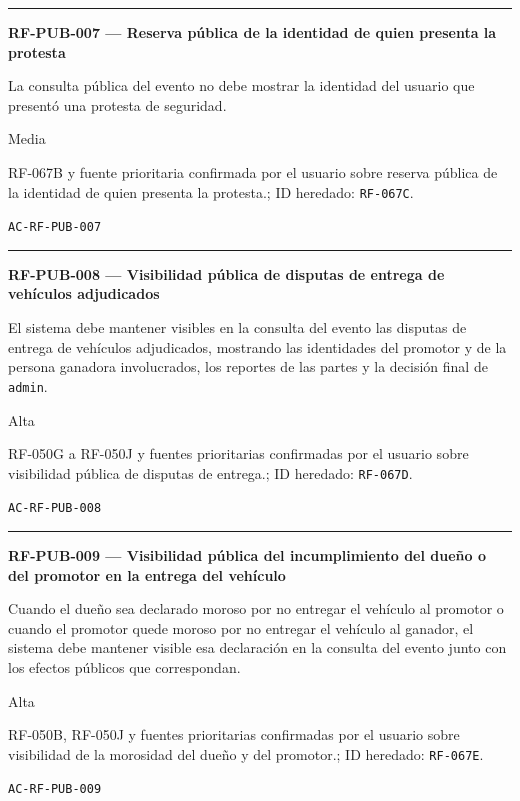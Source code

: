 \documentclass[10pt,letterpaper]{article}
\begin{document}
\vspace{0.25em}\hrule\vspace{0.65em}
\noindent\textbf{RF-PUB-007 --- Reserva pública de la identidad de quien presenta la protesta}\par
\begin{description}[style=nextline,leftmargin=3.15cm,labelwidth=2.8cm,font=\normalfont\bfseries]
\item[Obligación] La consulta pública del evento no debe mostrar la identidad del usuario que presentó una protesta de seguridad.
\item[Prioridad] Media
\item[Procedencia] RF-067B y fuente prioritaria confirmada por el usuario sobre reserva pública de la identidad de quien presenta la protesta.; ID heredado: \texttt{RF-067C}.
\item[Verificación] \texttt{AC-RF-PUB-007}
\end{description}
\vspace{0.25em}\hrule\vspace{0.65em}
\noindent\textbf{RF-PUB-008 --- Visibilidad pública de disputas de entrega de vehículos adjudicados}\par
\begin{description}[style=nextline,leftmargin=3.15cm,labelwidth=2.8cm,font=\normalfont\bfseries]
\item[Obligación] El sistema debe mantener visibles en la consulta del evento las disputas de entrega de vehículos adjudicados, mostrando las identidades del promotor y de la persona ganadora involucrados, los reportes de las partes y la decisión final de \texttt{admin}.
\item[Prioridad] Alta
\item[Procedencia] RF-050G a RF-050J y fuentes prioritarias confirmadas por el usuario sobre visibilidad pública de disputas de entrega.; ID heredado: \texttt{RF-067D}.
\item[Verificación] \texttt{AC-RF-PUB-008}
\end{description}
\vspace{0.25em}\hrule\vspace{0.65em}
\noindent\textbf{RF-PUB-009 --- Visibilidad pública del incumplimiento del dueño o del promotor en la entrega del vehículo}\par
\begin{description}[style=nextline,leftmargin=3.15cm,labelwidth=2.8cm,font=\normalfont\bfseries]
\item[Obligación] Cuando el dueño sea declarado moroso por no entregar el vehículo al promotor o cuando el promotor quede moroso por no entregar el vehículo al ganador, el sistema debe mantener visible esa declaración en la consulta del evento junto con los efectos públicos que correspondan.
\item[Prioridad] Alta
\item[Procedencia] RF-050B, RF-050J y fuentes prioritarias confirmadas por el usuario sobre visibilidad de la morosidad del dueño y del promotor.; ID heredado: \texttt{RF-067E}.
\item[Verificación] \texttt{AC-RF-PUB-009}
\end{description}
\end{document}
